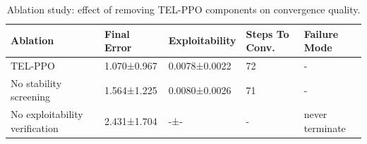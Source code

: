 \begin{table}[htbp]
\centering
\caption{Ablation study: effect of removing TEL-PPO components on convergence quality.}
\label{tab:ablation_results}
\begin{tabular}{lllll}
\toprule
Ablation & Final Error & Exploitability & Steps To Conv. & Failure Mode \\
\midrule
TEL-PPO & 1.070±0.967 & 0.0078±0.0022 & 72 & - \\
No stability screening & 1.564±1.225 & 0.0080±0.0026 & 71 & - \\
No exploitability verification & 2.431±1.704 & -±- & - & never terminate \\
\bottomrule
\end{tabular}

\end{table}
